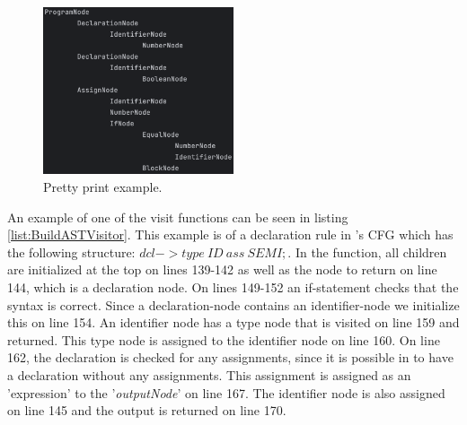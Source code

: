 \begin{figure}[H] 
    \begin{center}
        \includegraphics[width=0.5\textwidth]{Files/Billeder: Impl/pretty_print.png}
    \end{center}
    \caption{Pretty print example.}
    \label{fig:pretty_print}
\end{figure}

\noindent
An example of one of the visit functions can be seen in listing \ref{list:BuildASTVisitor}. This example is of a declaration rule in \lang's CFG which has the following structure: $dcl -> type \ ID \ ass \ SEMI;$. In the function, all children are initialized at the top on lines 139-142 as well as the node to return on line 144, which is a declaration node. On lines 149-152 an if-statement checks that the syntax is correct. Since a declaration-node contains an identifier-node we initialize this on line 154. An identifier node has a type node that is visited on line 159 and returned. This type node is assigned to the identifier node on line 160. On line 162, the declaration is checked for any assignments, since it is possible in \lang to have a declaration without any assignments. This assignment is assigned as an 'expression' to the '\textit{outputNode}' on line 167. The identifier node is also assigned on line 145 and the output is returned on line 170.

